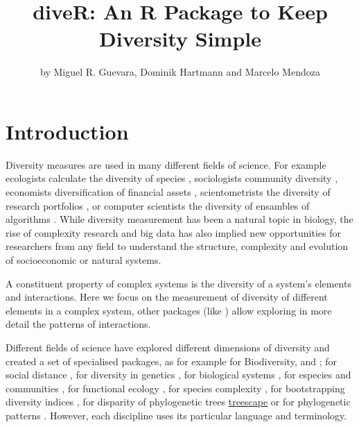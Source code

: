 \title{diveR: An R Package to Keep Diversity Simple}
\author{by Miguel R. Guevara, Dominik Hartmann and Marcelo Mendoza}

\maketitle



\section{Introduction}
Diversity measures are used in many different fields of science. For example ecologists calculate the diversity of species \citep{forey_systematics_1994}, sociologists community diversity \citep{haughton_economic_1995}, economists diversification of financial assets \citep{hidalgo_product_2007}, scientometrists the diversity of research portfolios \citep{rafols_knowledge_2014}, or computer scientists the diversity of ensambles of algorithms \citep{kuncheva_measures_2003}. While diversity measurement has been a natural topic in biology, the rise of complexity research and big data has also implied new opportunities for researchers from any field to understand the structure, complexity and evolution of socioeconomic or natural systems.

A constituent property of complex systems is the diversity of a system’s elements and interactions. Here we focus on the measurement of diversity of different elements in a complex system, other packages (like ) allow exploring in more detail the patterns of interactions. 

Different fields of science have explored different dimensions of diversity and created a set of specialised packages, as for example for Biodiversity,  and ; for social distance , for diversity in genetics , for biological systems , for especies and communities , for functional ecology , for species complexity , for bootstrapping diversity indices , for disparity of phylogenetic trees \href{https://github.com/thibautjombart/treescape}{treescape} or for phylogenetic patterns . However, each discipline uses its particular language and terminology.


